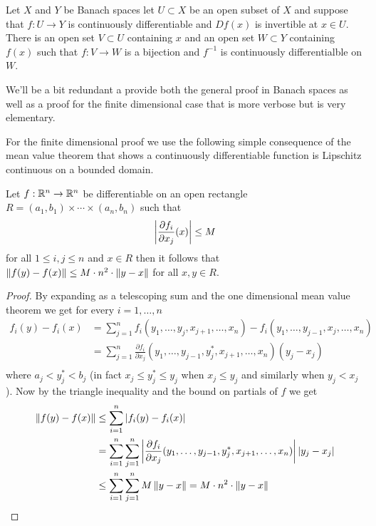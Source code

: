 \begin{thm}\label{InverseFunctionTheoremBanachSpaces}Let $X$ and $Y$ be Banach spaces let $U \subset X$ be an
  open subset of $X$ and suppose that $f : U \to Y$ is continuously
  differentiable and $Df(x)$ is invertible at $x \in U$.  There is an
  open set $V \subset U$ containing $x$ and an open set $W \subset Y$
  containing
  $f(x)$ such that $f : V \to W$ is a bijection and $f^{-1}$ is
  continuously differentialble on $W$.
\end{thm}

We'll be a bit redundant a  provide both the general proof in Banach spaces as
well as a proof for the finite dimensional case that is more verbose
but is very elementary.

For the finite dimensional proof we use the following simple
consequence of the mean value theorem
that shows a continuously differentiable function is Lipschitz
continuous on a bounded domain.
\begin{lem}\label{IFT:BoundedDerivativeImpliesLipschitz}Let $f : \mathbb{R}^n \to \mathbb{R}^n$ be differentiable on an
  open rectangle $R = (a_1,b_1) \times \dotsm \times (a_n, b_n)$ such that 
\begin{align*}
\left \vert \frac{\partial f_i}{\partial x_j}(x) \right \vert \leq M
\end{align*}
for all $1 \leq i,j \leq n$ and $x \in R$ then it follows that
$\left \lVert f(y)-f(x) \right \rVert \leq M \cdot n^2 \cdot \left \lVert y-x \right \rVert$ for all $x,y \in R$.
\end{lem}
\begin{proof}
By expanding as a telescoping sum and the one
dimensional mean value theorem we
get for every $i=1, \dotsc, n$ 
\begin{align*}
f_i(y) - f_i(x) &= \sum_{j=1}^n f_i(y_1, \dotsc, y_j, x_{j+1},
                     \dotsc, x_n) - 
f_i(y_1, \dotsc, y_{j-1}, x_{j},
                     \dotsc, x_n)\\
&= \sum_{j=1}^n \frac{\partial f_i}{\partial x_j} (y_1, \dotsc, y_{j-1}, y^*_j, x_{j+1},
                     \dotsc, x_n) (y_j - x_j)\\
\end{align*}
where $a_j < y^*_j  < b_j$ (in fact $x_j \leq y^*_j \leq y_j$ when
$x_j \leq y_j$ and similarly when $y_j < x_j$).  Now by the triangle
inequality and the bound on partials of $f$ we get
\begin{align*}
\left \lVert f(y) - f(x) \right \rVert &\leq \sum_{i=1}^n \left \vert f_i(y) - f_i(x) \right \vert \\
&= \sum_{i=1}^n \sum_{j=1}^n \left \vert \frac{\partial f_i}{\partial x_j} (y_1, \dotsc, y_{j-1}, y^*_j, x_{j+1},
                     \dotsc, x_n) \right \vert \left \vert  y_j - x_j  \right \vert \\
&\leq \sum_{i=1}^n \sum_{j=1}^n M \left \lVert y - x \right \rVert = M \cdot n^2 \cdot
  \left \lVert y -x \right \rVert
\end{align*}
\end{proof}

